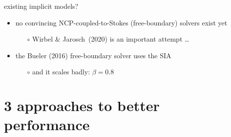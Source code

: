 \documentclass[svgnames,
               hyperref={colorlinks,citecolor=DeepPink4,linkcolor=FireBrick,urlcolor=Maroon},
               usepdftitle=false]  %
               {beamer}
\begin{document}
\begin{frame}{existing implicit models?}

\begin{itemize}
\item no convincing NCP-coupled-to-Stokes (free-boundary) solvers exist yet
    \begin{itemize}
    \item[$\circ$] Wirbel \& Jarosch~(2020) is an important attempt \dots
    \end{itemize}
\item the Bueler (2016) free-boundary solver uses the SIA
    \begin{itemize}
    \item[$\circ$] and it scales badly: $\beta=0.8$
    \end{itemize}
\end{itemize}
\end{frame}


\section{3 approaches to better performance}
\end{document}
